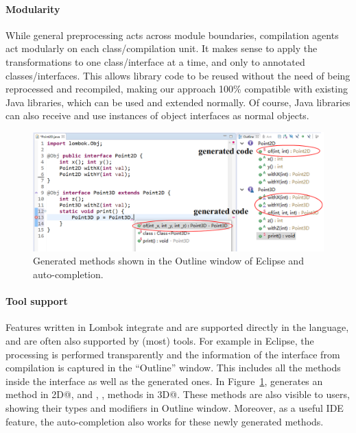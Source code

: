 \paragraph{Modularity}
While general preprocessing acts across module boundaries, compilation
agents act modularly on each class/compilation unit. It makes sense to
apply the transformations to one class/interface at a time, and only to
annotated classes/interfaces. This allows library code to be reused
without the need of being reprocessed and recompiled, making our
approach 100\% compatible with existing Java libraries, which can be
used and extended normally. Of course, Java libraries can also receive
and use instances of object interfaces as normal objects.

\begin{figure}[t]
\saveSpaceFig
\saveSpaceFig
\centering
\includegraphics[width=6in]{pdfs/screenshot4.png}
\caption{Generated methods shown in the Outline window of Eclipse and auto-completion.}
\label{fig:screenshot}
\saveSpaceFig
\end{figure}

\paragraph{Tool support}
Features written in Lombok integrate and are supported directly in the
language, and are often also supported by (most) tools.  For example in Eclipse, the processing is
performed transparently and the information of the interface from
compilation is captured in the ``Outline'' window.
This includes all
the methods inside the interface as well as the generated ones.
In Figure~\ref{fig:screenshot},
\mixin generates an \Q@of@ method in \Q@Point2D@, and \Q@of@, \Q@withX@, \Q@withY@ methods in \Q@Point3D@.
These methods are also visible to users, showing their types and modifiers in Outline window.
Moreover, as a useful IDE feature, the auto-completion also works for these newly generated methods.

